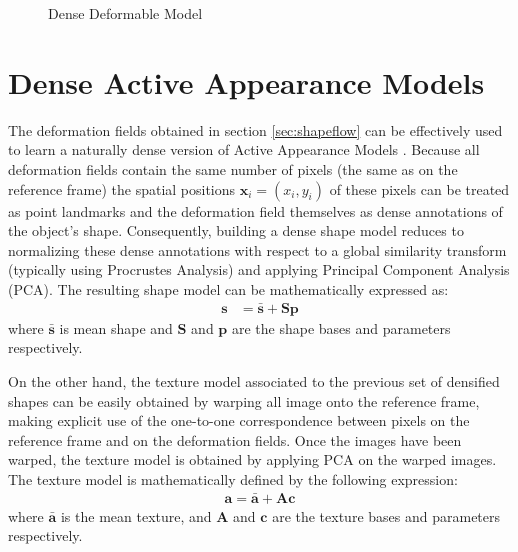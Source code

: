 \begin{figure}[h!]
\begin{subfigure}[b]{0.4\textwidth}
    \end{subfigure}
    \caption{Dense Deformable Model}
    \label{fig:models}
\end{figure}


\section{Dense Active Appearance Models}

The deformation fields obtained in section \ref{sec:shapeflow} can be effectively used to learn a naturally dense version of Active Appearance Models \cite{Cootes2001, Matthews2004}. Because all deformation fields contain the same number of pixels (the same as on the reference frame) the spatial positions $\mathbf{x}_i=(x_i, y_i)$ of these pixels can be treated as point landmarks and the deformation field themselves as dense annotations of the object's shape. Consequently, building a dense shape model reduces to normalizing these dense annotations with respect to a global similarity transform (typically using Procrustes Analysis) and applying Principal Component Analysis (PCA). The resulting shape model can be mathematically expressed as:
\begin{equation}
    \begin{aligned}
        \mathbf{s} & = \mathbf{\bar{s}} + \mathbf{S} \mathbf{p}
    \end{aligned}
    \label{eq:shape_model}
\end{equation}
where $\mathbf{\bar{s}}$ is mean shape and $\mathbf{S}$ and $\mathbf{p}$ are the shape bases and parameters respectively.

On the other hand, the texture model associated to the previous set of densified shapes can be easily obtained by warping all image onto the reference frame, making explicit use of the one-to-one correspondence between pixels on the reference frame and on the deformation fields. Once the images have been warped, the texture model is obtained by applying PCA on the warped images. The texture model is mathematically defined by the following expression:
\begin{equation}
    \begin{aligned}
        \mathbf{a} = \mathbf{\bar{a}} + \mathbf{A} \mathbf{c}
    \end{aligned}
	\label{eq:tex_model}
\end{equation}
where $\mathbf{\bar{a}}$ is the mean texture, and $\mathbf{A}$ and $\mathbf{c}$ are the texture bases and parameters respectively.

